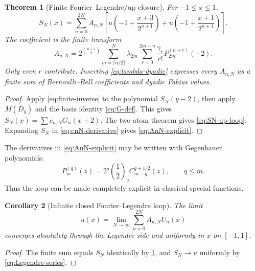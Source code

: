 \documentclass[11pt,oneside]{article}
\newtheorem{theorem}{Theorem}[section]
\newtheorem{corollary}[theorem]{Corollary}
\theoremstyle{definition}
\theoremstyle{remark}
\begin{document}
\begin{theorem}[Finite Fourier--Legendre/up closure]
\label{thm:Legendre-finite-loop}
For $-1\le x\le1$,
\begin{equation}
 \boxed{
 S_N(x)=\sum_{n=0}^{2N}A_{n,N}
 \left[
 u\!\left(-1+\frac{x+3}{2^{n+1}}\right)
 +u\!\left(-1+\frac{x+1}{2^{n+1}}\right)
 \right].}
 \label{eq:SN-up-loop}
\end{equation}
The coefficient is the finite transform
\begin{equation}
 \boxed{
 A_{n,N}=2^{\binom{n+1}{2}}
 \sum_{m=\lceil n/2\rceil}^{N}\lambda_{2m}
 \sum_{r=0}^{2m-n}\frac{\gamma_r}{r!}
 P_{2m}^{(n+r)}(-2).}
 \label{eq:AnN-explicit}
\end{equation}
Only even $r$ contribute.  Inserting \eqref{eq:lambda-dyadic} expresses every
$A_{n,N}$ as a finite sum of Bernoulli--Bell coefficients and dyadic Fabius
values.
\end{theorem}

\begin{proof}
Apply \eqref{eq:finite-inverse} to the polynomial $S_N(y-2)$, then apply
$M(D_y)$ and the basis identity \eqref{eq:G-def}.  This gives
$S_N(x)=\sum c_{n,N}G_n(x+2)$.  The two-atom theorem gives
\eqref{eq:SN-up-loop}.  Expanding $S_N$ in \eqref{eq:cnN-derivative} gives
\eqref{eq:AnN-explicit}.
\end{proof}

The derivatives in \eqref{eq:AnN-explicit} may be written with Gegenbauer
polynomials:
\begin{equation}
 P_m^{(q)}(z)=2^q\left(\frac12\right)_q
 C_{m-q}^{q+1/2}(z),
 \qquad q\le m.
 \label{eq:Legendre-derivative-Gegenbauer}
\end{equation}
Thus the loop can be made completely explicit in classical special
functions.

\begin{corollary}[Infinite closed Fourier--Legendre loop]
\label{cor:infinite-Legendre-loop}
The limit
\begin{equation}
 \boxed{
 u(x)=\lim_{N\to\infty}\sum_{n=0}^{2N}A_{n,N}U_n(x)}
 \label{eq:infinite-Legendre-loop}
\end{equation}
converges absolutely through the Legendre side and uniformly in $x$ on
$[-1,1]$.
\end{corollary}

\begin{proof}
The finite sum equals $S_N$ identically by
\cref{thm:Legendre-finite-loop}, and $S_N\to u$ uniformly by
\eqref{eq:Legendre-series}.
\end{proof}
\end{document}
